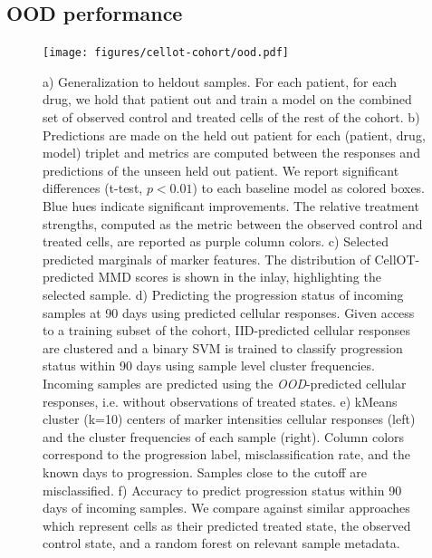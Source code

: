 \subsection{OOD performance}
\begin{figure}[ht!]
  \label{fig:ood-main}
  \begin{center}
    \texttt{[image: figures/cellot-cohort/ood.pdf]}
  \end{center}
  \caption{
    a) Generalization to heldout samples. For each patient, for each drug, we hold that patient out and train a model on the combined set of observed control and treated cells of the rest of the cohort.
    b) Predictions are made on the held out patient for each (patient, drug, model) triplet and metrics are computed between the responses and predictions of the unseen held out patient.
    We report significant differences (t-test, $p < 0.01$) to each baseline model as colored boxes. Blue hues indicate significant improvements.
    The relative treatment strengths, computed as the metric between the observed control and treated cells, are reported as purple column colors.
    c) Selected predicted marginals of marker features.
    The distribution of CellOT-predicted MMD scores is shown in the inlay, highlighting the selected sample.
    d) Predicting the progression status of incoming samples at 90 days using predicted cellular responses.
    Given access to a training subset of the cohort, IID-predicted cellular responses are clustered and a binary SVM is trained to classify progression status within 90 days using sample level cluster frequencies.
    Incoming samples are predicted using the \emph{OOD}-predicted cellular responses, i.e. without observations of treated states.
    e) kMeans cluster (k=10) centers of marker intensities cellular responses (left) and the cluster frequencies of each sample (right).
    Column colors correspond to the progression label, misclassification rate, and the known days to progression. Samples close to the cutoff are misclassified.
    f) Accuracy to predict progression status within 90 days of incoming samples.
    We compare against similar approaches which represent cells as their predicted treated state, the observed control state, and a random forest on relevant sample metadata.
  }
\end{figure}

